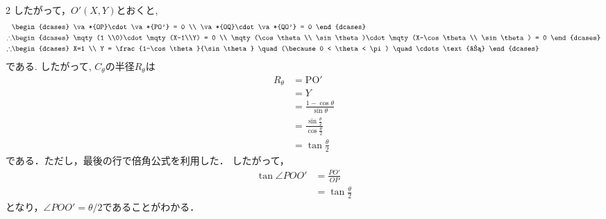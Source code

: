\documentclass[../../main.tex]{subfiles}
\begin{document}
\begin{multicols}{2}
  したがって，$O'(X,Y)$とおくと,
  \begin{align}
     & \begin{dcases}
         \va*{OP}\cdot \va*{PO'} = 0 \\
         \va*{OQ}\cdot \va*{QO'} = 0
       \end{dcases}                                                               \\
    \therefore
     & \begin{dcases}
         \mqty(1          \\0)\cdot \mqty(X-1\\Y) = 0 \\
         \mqty(\cos\theta \\ \sin\theta)\cdot \mqty(X-\cos\theta\\ \sin\theta) = 0
       \end{dcases}                  \\
    \therefore
     & \begin{dcases}
         X=1 \\
         Y = \frac{1-\cos\theta}{\sin\theta} \quad (\because 0 < \theta < \pi) \quad \cdots\text{②}
       \end{dcases}
  \end{align}
  である. したがって, $C_{\theta}$の半径$R_{\theta}$は
  \begin{align}
    R_{\theta}
     & = \mathrm{PO'}                                      \\
     & = Y                                                 \\
     & = \frac{1-\cos\theta}{\sin\theta}                   \\
     & = \frac{\sin\frac{\theta}{2}}{\cos\frac{\theta}{2}} \\
     & = \tan\frac{\theta}{2}
  \end{align}
  である．ただし，最後の行で倍角公式を利用した．
  したがって，
  \begin{align*}
    \tan \angle POO'
     & = \frac{PO'}{OP}      \\
     & =\tan\frac{\theta}{2}
  \end{align*}
  となり，$\angle POO'=\theta/2$であることがわかる．

  \begin{figure}[H]
    \centering
\end{figure}
\end{multicols}
\end{document}
